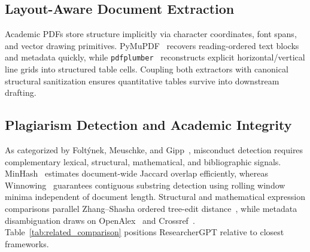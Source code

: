 \documentclass[conference]{IEEEtran}
\begin{document}
\subsection{Layout-Aware Document Extraction}
Academic PDFs store structure implicitly via character coordinates, font spans, and vector drawing primitives. PyMuPDF~\cite{pymupdf2024docs} recovers reading-ordered text blocks and metadata quickly, while \texttt{pdfplumber}~\cite{singervine2024pdfplumber} reconstructs explicit horizontal/vertical line grids into structured table cells. Coupling both extractors with canonical structural sanitization ensures quantitative tables survive into downstream drafting.

\subsection{Plagiarism Detection and Academic Integrity}
As categorized by Folt\'{y}nek, Meuschke, and Gipp~\cite{foltynek2019plagiarism}, misconduct detection requires complementary lexical, structural, mathematical, and bibliographic signals. MinHash~\cite{broder1997minhash} estimates document-wide Jaccard overlap efficiently, whereas Winnowing~\cite{schleimer2003winnowing} guarantees contiguous substring detection using rolling window minima independent of document length. Structural and mathematical expression comparisons parallel Zhang--Shasha ordered tree-edit distance~\cite{zhang1989ted}, while metadata disambiguation draws on OpenAlex~\cite{priem2022openalex} and Crossref~\cite{hendricks2020crossref}. Table~\ref{tab:related_comparison} positions ResearcherGPT relative to closest frameworks.
\end{document}
